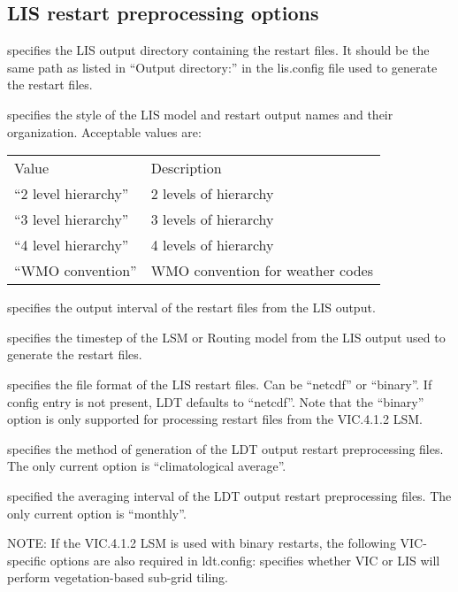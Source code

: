  
 \subsection{LIS restart preprocessing options} \label{ssec:rstopts}
 

 
  specifies the LIS output
 directory containing the restart files.  It should be the same
 path as listed in ``Output directory:'' in the lis.config file
 used to generate the restart files.

  specifies the style of
 the LIS model and restart output names and their organization.
 Acceptable values are:

 \begin{tabular}{ll}
 Value                 & Description                       \\
 ``2 level hierarchy'' & 2 levels of hierarchy             \\
 ``3 level hierarchy'' & 3 levels of hierarchy             \\
 ``4 level hierarchy'' & 4 levels of hierarchy             \\
 ``WMO convention''    & WMO convention for weather codes  \\
 \end{tabular}

  specifies the output
 interval of the restart files from the LIS output.

  specifies the timestep
 of the LSM or Routing model from the LIS output used to generate
 the restart files.

  specifies the file format of the
 LIS restart files.  Can be ``netcdf'' or ``binary''.  If config
 entry is not present, LDT defaults to ``netcdf''.  Note that the
 ``binary'' option is only supported for processing restart files
 from the VIC.4.1.2 LSM.

  specifies the method
 of generation of the LDT output restart preprocessing files.
 The only current option is ``climatological average''.

  specified the
 averaging interval of the LDT output restart preprocessing files.
 The only current option is ``monthly''.

 NOTE: If the VIC.4.1.2 LSM is used with binary restarts, the
 following VIC-specific options are also required in ldt.config:
  specifies whether VIC or LIS
 will perform vegetation-based sub-grid tiling.

